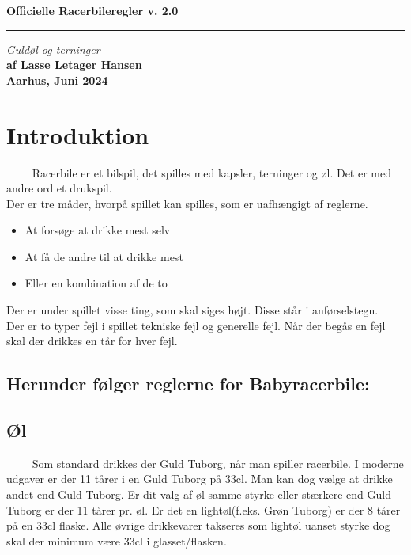 \documentclass[12pt]{article}
\begin{document}
 \begin{flushright}
  {\Huge\bfseries Officielle Racerbileregler v. 2.0}\\
  \rule{\textwidth}{2pt}
  {\large\itshape Guldøl og terninger}\\
  {\bfseries af Lasse Letager Hansen\\[4ex]
Aarhus, Juni 2024\\}
 \end{flushright}
 \thispagestyle{empty}
 \clearpage

\newpage

\section*{Introduktion}

$\qquad$ Racerbile er et bilspil, det spilles med kapsler, terninger og øl. Det er med andre ord et drukspil.\\
Der er tre måder, hvorpå spillet kan spilles, som er uafhængigt af reglerne.
\begin{itemize}
	\item At forsøge at drikke mest selv
	\item At få de andre til at drikke mest
	\item Eller en kombination af de to
\end{itemize}

Der er under spillet visse ting, som skal siges højt. Disse står i anførselstegn.\\

Der er to typer fejl i spillet tekniske fejl og generelle fejl. Når der begås en fejl skal der drikkes en tår for hver fejl.\\

\subsection*{Herunder følger reglerne for Babyracerbile:}

\subsection*{Øl}

$\qquad$ Som standard drikkes der Guld Tuborg, når man spiller racerbile. I moderne udgaver er der 11 tårer i en Guld Tuborg på 33cl. Man kan dog vælge at drikke andet end Guld Tuborg. Er dit valg af øl samme styrke eller stærkere end Guld Tuborg er der 11 tårer pr. øl. Er det en lightøl(f.eks. Grøn Tuborg) er der 8 tårer på en 33cl flaske. Alle øvrige drikkevarer takseres som lightøl uanset styrke dog skal der minimum være 33cl i glasset/flasken.
\end{document}
